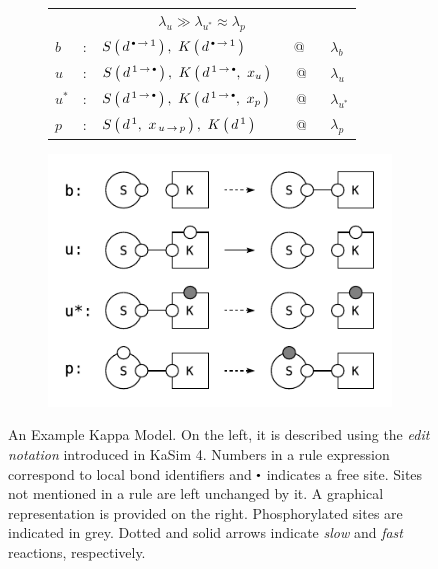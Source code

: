 \begin{figure}
  \vspace{-0.2cm}
  \begin{subfigure}[h]{0.4\linewidth}
    \def\arraystretch{1.8}
    \begin{small}
      \begin{tabular}{lllcl}
        \multicolumn{5}{c}{$\lambda_u \gg \lambda_{u^*} \approx \lambda_p$} \\
        $b$ \hspace{0.05cm} & : \hspace{0.1cm} & $ \AG{S}{d^{\Trans{\Free}{1}}}, \ 
        \AG{K}{d^{\Trans{\Free}{1}}} $ &  \ @ \  & $\lambda_b$ \\
        $u$ & : & $ \AG{S}{d^{\Trans{1}{\Free}}}, \ 
                  \AG{K}{d^{\Trans{1}{\Free}}, \ x_u} $ & @ & $\lambda_u$ \\
        $u^*$ & : & $ \AG{S}{d^{\Trans{1}{\Free}}}, \ 
                    \AG{K}{d^{\Trans{1}{\Free}}, \ x_p} $ & @ & $\lambda_{u^*}$ \\
        $p$ & : & $ \AG{S}{d^{\,1}, \  x_{\Trans{u}{p}}}, \ 
                  \AG{K}{d^{\,1}} $ & @ & $\lambda_p$ \\
      \end{tabular}
    \end{small}
  \end{subfigure}
  \hfill
  \begin{subfigure}[h]{0.46\linewidth}
    \begin{center}
      \includegraphics[scale=0.8]{kappa-diagrams/model.pdf}
    \end{center}
  \end{subfigure}
  \caption{An Example Kappa Model. On the left, it is described using
    the \textit{edit notation} introduced in KaSim 4. Numbers in a
    rule expression correspond to local bond identifiers and $\Free$
    indicates a free site. Sites not mentioned in a rule are left
    unchanged by it. A graphical representation is provided on the
    right. Phosphorylated sites are indicated in grey. Dotted and
    solid arrows indicate \textit{slow} and \textit{fast} reactions,
    respectively.  }\label{fig:model}
\end{figure}
